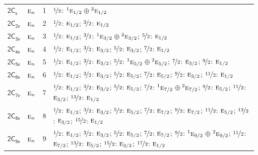 \documentclass[10pt,a4paper]{article}
\numberwithin{equation}{section}
\newcommand{\grp}[1]{\mathsf{#1}}
\newcommand{\irr}[1]{\text{\normalfont\scshape #1}}
\newcommand{\conjpair}[1]{{}^{#1}}
\newlength{\fillwidth}\newlength{\cellwidth}\newlength{\colwidth}
\begin{document}
{\begin{longtable}{@{}llr>{\RaggedRight\arraybackslash}p{\fillwidth}@{}}
\href{2C1v.pdf}{$\grp{2C_{s}}$} & $\irr{e}_{n}$ & 1 & $\nicefrac{1}{2}$: $\conjpair{1}\irr{e}_{1/2}$${}\oplus{}$$\conjpair{2}\irr{e}_{1/2}$\\
\href{2C2v.pdf}{$\grp{2C_{2v}}$} & $\irr{e}_{n}$ & 2 & $\nicefrac{1}{2}$: $\irr{e}_{1/2}$; $\nicefrac{3}{2}$: $\irr{e}_{1/2}$\\
\href{2C3v.pdf}{$\grp{2C_{3v}}$} & $\irr{e}_{n}$ & 3 & $\nicefrac{1}{2}$: $\irr{e}_{1/2}$; $\nicefrac{3}{2}$: $\conjpair{1}\irr{e}_{3/2}$${}\oplus{}$$\conjpair{2}\irr{e}_{3/2}$; $\nicefrac{5}{2}$: $\irr{e}_{1/2}$\\
\href{2C4v.pdf}{$\grp{2C_{4v}}$} & $\irr{e}_{n}$ & 4 & $\nicefrac{1}{2}$: $\irr{e}_{1/2}$; $\nicefrac{3}{2}$: $\irr{e}_{3/2}$; $\nicefrac{5}{2}$: $\irr{e}_{3/2}$; $\nicefrac{7}{2}$: $\irr{e}_{1/2}$\\
\href{2C5v.pdf}{$\grp{2C_{5v}}$} & $\irr{e}_{n}$ & 5 & $\nicefrac{1}{2}$: $\irr{e}_{1/2}$; $\nicefrac{3}{2}$: $\irr{e}_{3/2}$; $\nicefrac{5}{2}$: $\conjpair{1}\irr{e}_{5/2}$${}\oplus{}$$\conjpair{2}\irr{e}_{5/2}$; $\nicefrac{7}{2}$: $\irr{e}_{3/2}$; $\nicefrac{9}{2}$: $\irr{e}_{1/2}$\\
\href{2C6v.pdf}{$\grp{2C_{6v}}$} & $\irr{e}_{n}$ & 6 & $\nicefrac{1}{2}$: $\irr{e}_{1/2}$; $\nicefrac{3}{2}$: $\irr{e}_{3/2}$; $\nicefrac{5}{2}$: $\irr{e}_{5/2}$; $\nicefrac{7}{2}$: $\irr{e}_{5/2}$; $\nicefrac{9}{2}$: $\irr{e}_{3/2}$; $\nicefrac{11}{2}$: $\irr{e}_{1/2}$\\
\href{2C7v.pdf}{$\grp{2C_{7v}}$} & $\irr{e}_{n}$ & 7 & $\nicefrac{1}{2}$: $\irr{e}_{1/2}$; $\nicefrac{3}{2}$: $\irr{e}_{3/2}$; $\nicefrac{5}{2}$: $\irr{e}_{5/2}$; $\nicefrac{7}{2}$: $\conjpair{1}\irr{e}_{7/2}$${}\oplus{}$$\conjpair{2}\irr{e}_{7/2}$; $\nicefrac{9}{2}$: $\irr{e}_{5/2}$; $\nicefrac{11}{2}$: $\irr{e}_{3/2}$; $\nicefrac{13}{2}$: $\irr{e}_{1/2}$\\
\href{2C8v.pdf}{$\grp{2C_{8v}}$} & $\irr{e}_{n}$ & 8 & $\nicefrac{1}{2}$: $\irr{e}_{1/2}$; $\nicefrac{3}{2}$: $\irr{e}_{3/2}$; $\nicefrac{5}{2}$: $\irr{e}_{5/2}$; $\nicefrac{7}{2}$: $\irr{e}_{7/2}$; $\nicefrac{9}{2}$: $\irr{e}_{7/2}$; $\nicefrac{11}{2}$: $\irr{e}_{5/2}$; $\nicefrac{13}{2}$: $\irr{e}_{3/2}$; $\nicefrac{15}{2}$: $\irr{e}_{1/2}$\\
\href{2C9v.pdf}{$\grp{2C_{9v}}$} & $\irr{e}_{n}$ & 9 & $\nicefrac{1}{2}$: $\irr{e}_{1/2}$; $\nicefrac{3}{2}$: $\irr{e}_{3/2}$; $\nicefrac{5}{2}$: $\irr{e}_{5/2}$; $\nicefrac{7}{2}$: $\irr{e}_{7/2}$; $\nicefrac{9}{2}$: $\conjpair{1}\irr{e}_{9/2}$${}\oplus{}$$\conjpair{2}\irr{e}_{9/2}$; $\nicefrac{11}{2}$: $\irr{e}_{7/2}$; $\nicefrac{13}{2}$: $\irr{e}_{5/2}$; $\nicefrac{15}{2}$: $\irr{e}_{3/2}$; $\nicefrac{17}{2}$: $\irr{e}_{1/2}$\\

\end{longtable}}
\end{document}
